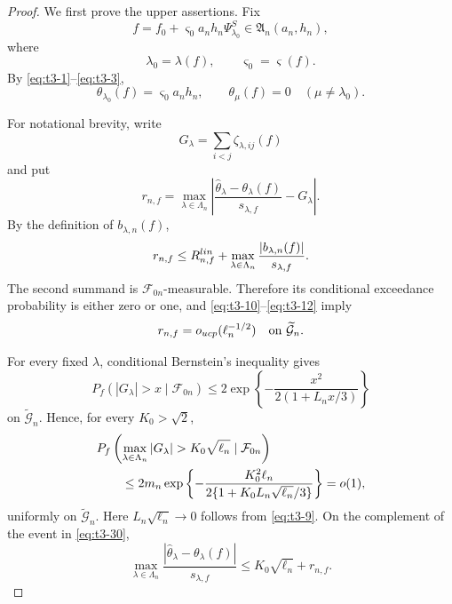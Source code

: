 \documentclass[10pt,a4paper]{amsart}
\begin{document}
\begin{proof}
We first prove the upper assertions.  Fix
\[
f
=
f_0+\varsigma_0a_n h_n\Psi_{\lambda_0}^S
\in\mathfrak A_n(a_n,h_n),
\]
where
\[
\lambda_0=\lambda(f),
\qquad
\varsigma_0=\varsigma(f).
\]
By \eqref{eq:t3-1}--\eqref{eq:t3-3},
\begin{equation}
\theta_{\lambda_0}(f)
=
\varsigma_0a_n h_n,
\qquad
\theta_\mu(f)=0
\quad(\mu\ne\lambda_0).
\label{eq:t3-28}
\end{equation}

For notational brevity, write
\[
G_\lambda
=
\sum_{i<j}\zeta_{\lambda,ij}(f)
\]
and put
\[
r_{n,f}
=
\max_{\lambda\in\Lambda_n}
\left|
\frac{\widehat\theta_\lambda-\theta_\lambda(f)}
{s_{\lambda,f}}
-
G_\lambda
\right|.
\]
By the definition of \(b_{\lambda,n}(f)\),
\[
r_{n,f}
\le
R_{n,f}^{\rm lin}
+
\max_{\lambda\in\Lambda_n}
\frac{|b_{\lambda,n}(f)|}{s_{\lambda,f}}.
\]
The second summand is \(\mathcal F_{0n}\)-measurable.  Therefore its
conditional exceedance probability is either zero or one, and
\eqref{eq:t3-10}--\eqref{eq:t3-12} imply
\begin{equation}
r_{n,f}
=
o_{\rm ucp}(\ell_n^{-1/2})
\quad
\text{on }\widetilde{\mathcal G}_n.
\label{eq:t3-29}
\end{equation}

For every fixed \(\lambda\), conditional Bernstein's inequality gives
\[
P_f\left(
|G_\lambda|>x
\mid\mathcal F_{0n}
\right)
\le
2\exp\left\{
-\frac{x^2}{2(1+L_nx/3)}
\right\}
\]
on \(\widetilde{\mathcal G}_n\).  Hence, for every
\(K_0>\sqrt2\),
\begin{align}
&P_f\left(
\max_{\lambda\in\Lambda_n}|G_\lambda|
>
K_0\sqrt{\ell_n}
\mid\mathcal F_{0n}
\right)
\notag\\
&\qquad\le
2m_n
\exp\left\{
-\frac{K_0^2\ell_n}
{2\{1+K_0L_n\sqrt{\ell_n}/3\}}
\right\}
=o(1),
\label{eq:t3-30}
\end{align}
uniformly on \(\widetilde{\mathcal G}_n\).  Here
\(L_n\sqrt{\ell_n}\to0\) follows from \eqref{eq:t3-9}.  On the
complement of the event in \eqref{eq:t3-30},
\begin{equation}
\max_{\lambda\in\Lambda_n}
\frac{
|\widehat\theta_\lambda-\theta_\lambda(f)|
}{
s_{\lambda,f}
}
\le
K_0\sqrt{\ell_n}+r_{n,f}.
\label{eq:t3-31}
\end{equation}


\end{proof}
\end{document}

